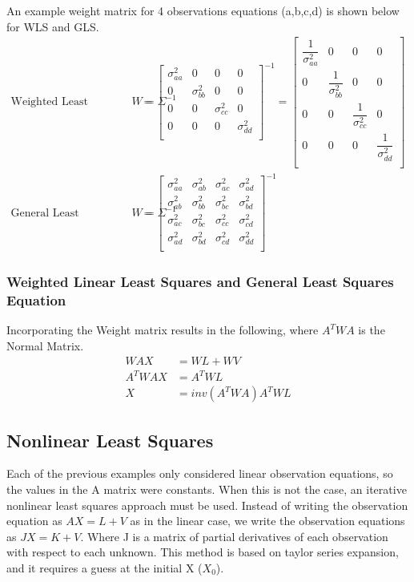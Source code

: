 An example weight matrix for 4 observations equations (a,b,c,d) is shown below for WLS and GLS.
\begin{align*}
\text{Weighted Least Squares(WLS) } W = \Sigma^{-1} &= 
\begin{bmatrix}
\sigma_{aa}^2 & 0 & 0 & 0 \\ 
0 & \sigma_{bb}^2 & 0 & 0 \\
0 & 0 & \sigma_{cc}^2 & 0 \\
0 & 0 & 0 & \sigma_{dd}^2 \\
\end{bmatrix}
^{-1}
=
\begin{bmatrix}
\dfrac{1}{\sigma_{aa}^2} & 0 & 0 & 0 \\ 
0 & \dfrac{1}{\sigma_{bb}^2} & 0 & 0 \\
0 & 0 & \dfrac{1}{\sigma_{cc}^2} & 0 \\
0 & 0 & 0 & \dfrac{1}{\sigma_{dd}^2} \\
\end{bmatrix}
\\
\text{General Least Squares(GLS) } W = \Sigma^{-1} &= 
\begin{bmatrix}
\sigma_{aa}^2 & \sigma_{ab}^2 & \sigma_{ac}^2 & \sigma_{ad}^2 \\ 
\sigma_{ab}^2 & \sigma_{bb}^2 & \sigma_{bc}^2 & \sigma_{bd}^2 \\ 
\sigma_{ac}^2 & \sigma_{bc}^2 & \sigma_{cc}^2 & \sigma_{cd}^2 \\ 
\sigma_{ad}^2 & \sigma_{bd}^2 & \sigma_{cd}^2 & \sigma_{dd}^2 \\ 
\end{bmatrix}
^{-1}
\end{align*}
\subsubsection*{Weighted Linear Least Squares and General Least Squares Equation}
Incorporating the Weight matrix results in the following, where $A^TWA$ is the Normal Matrix.
\begin{align*}
WAX &= WL + WV \\
A^TWAX &= A^TWL \\
X &= inv(A^TWA)A^TWL
\end{align*}

\subsection{Nonlinear Least Squares}
Each of the previous examples only considered linear observation equations, so the values in the A matrix were constants.  When this is not the case, an iterative nonlinear least squares approach must be used.  Instead of writing the observation equation as $AX=L+V$ as in the linear case, we write the observation equations as $JX=K+V$. Where J is a matrix of partial derivatives of each observation with respect to each unknown.  This method is based on taylor series expansion, and it requires a guess at the initial X ($X_0$).  

